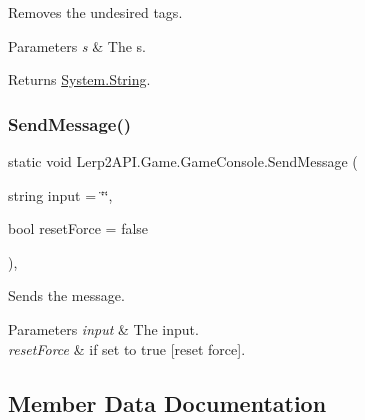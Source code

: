 Removes the undesired tags. 


\begin{DoxyParams}{Parameters}
{\em s} & The s.\\
\hline
\end{DoxyParams}
\begin{DoxyReturn}{Returns}
\hyperlink{namespace_lerp2_a_p_i_1_1_game_a2f182da062f210cc43f341f6992ee293a27118326006d3829667a400ad23d5d98}{System.\+String}.
\end{DoxyReturn}
\mbox{\label{class_lerp2_a_p_i_1_1_game_1_1_game_console_ac033b4cf507be1588339059c3c466ea3}} 
\subsubsection{\texorpdfstring{Send\+Message()}{SendMessage()}}
{\footnotesize\ttfamily static void Lerp2\+A\+P\+I.\+Game.\+Game\+Console.\+Send\+Message (\begin{DoxyParamCaption}\item[{string}]{input = {\ttfamily \char`\"{}\char`\"{}},  }\item[{bool}]{reset\+Force = {\ttfamily false} }\end{DoxyParamCaption})\hspace{0.3cm}{\ttfamily [inline]}, {\ttfamily [static]}}



Sends the message. 


\begin{DoxyParams}{Parameters}
{\em input} & The input.\\
\hline
{\em reset\+Force} & if set to {\ttfamily true} \mbox{[}reset force\mbox{]}.\\
\hline
\end{DoxyParams}


\subsection{Member Data Documentation}
\mbox{\label{class_lerp2_a_p_i_1_1_game_1_1_game_console_ad986d8fae40bb96cd778d1608f090ea6}} 
